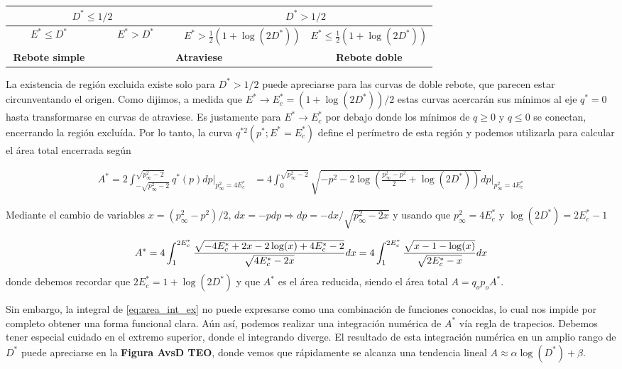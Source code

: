 \begin{table}[h]
	\centering
	\begin{tabular}{|c|c||c|c|}
		\hline
		\multicolumn{2}{|c||}{$D^*\leq1/2$} & \multicolumn{2}{c|}{$D^*>1/2$} \\ \hline
		    $\qquad E^*\leq D^* \qquad$      &    $\qquad E^*> D^* \qquad$       &    $E^*>\frac{1}{2}(1+\log(2D^*))$        &    $E^*\leq\frac{1}{2}(1+\log(2D^*))$     \\ \hline
		    \textbf{Rebote simple}      &    \multicolumn{2}{c|}{\textbf{Atraviese}}     &     \textbf{Rebote doble}    \\ \hline
	\end{tabular}
\end{table}

La existencia de región excluida existe solo para $D^*>1/2$ puede apreciarse para las curvas de doble rebote, que parecen estar circunventando el origen. 
Como dijimos, a medida que $E^*\to E^*_c = (1+\log(2D^*))/2$ estas curvas acercarán sus mínimos al eje $q^*=0$ hasta transformarse en curvas de atraviese.
Es justamente para $E^*\to E^*_c $ por debajo donde los mínimos de $q\geq0$ y $q\leq0$ se conectan, encerrando la región excluída. 
Por lo tanto, la curva $q^{*2}(p^*; E^*=E_c^*)$ define el perímetro de esta región y podemos utilizarla para calcular el área total encerrada según

\begin{align*}
A^* = 2\int_{-\sqrt{p_\infty^2-2}}^{\sqrt{p_\infty^2-2}} q^*(p) dp \Bigg|_{p_\infty^2=4E^*_c}
&= 4\int_{0}^{\sqrt{p_\infty^2-2}} \sqrt{-p^2 - 2\log\left( \frac{p_\infty^2-p^2}{2} + \log(2D^*) \right)} dp \Bigg|_{p_\infty^2=4E^*_c}
\end{align*}

Mediante el cambio de variables $x = (p_\infty^2-p^2)/2$, $dx = -p dp \Rightarrow dp = -dx/\sqrt{p_\infty^2-2x}$ y usando que $p_\infty^2 = 4E^*_c$ y $\log(2D^*) = 2E_c^* - 1$

\begin{equation}{\label{eq:area_int_ex}}
A^* = 4\int_{1}^{2E_c^*} \frac{\sqrt{-4E_c^* + 2x - 2\log(x) + 4E_c^* - 2}}{\sqrt{4E_c^* - 2x}} dx
= 4\int_{1}^{2E_c^*} \frac{\sqrt{x -1 - \log(x)}}{\sqrt{2E_c^* - x}} dx
\end{equation}
donde debemos recordar que $2E_c^* = 1 + \log(2D^*) $ y que $A^*$ es el área reducida, siendo el área total $A = q_op_oA^*$.

Sin embargo, la integral de \eqref{eq:area_int_ex} no puede expresarse como una combinación de funciones conocidas, lo cual nos impide por completo obtener una forma funcional clara.
Aún así, podemos realizar una integración numérica de $A^*$ vía regla de trapecios.
Debemos tener especial cuidado en el extremo superior, donde el integrando diverge.
El resultado de esta integración numérica en un amplio rango de $D^*$ puede apreciarse en la \textbf{Figura AvsD TEO}, donde vemos que rápidamente se alcanza una tendencia lineal $A \approx \alpha \log(D^*) + \beta$.

